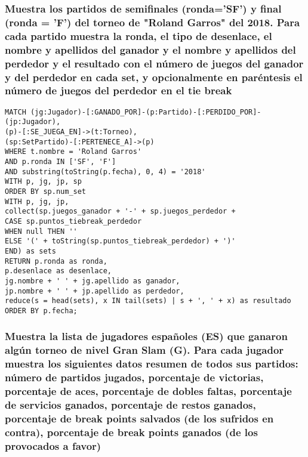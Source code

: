 \subsubsection{Muestra los partidos de semiﬁnales (ronda='SF') y ﬁnal (ronda = 'F') del torneo de "Roland Garros" del 2018. Para cada partido muestra la ronda, el tipo de desenlace, el nombre y apellidos del ganador y el nombre y apellidos del perdedor y el resultado con el número de juegos del ganador y del perdedor en cada set, y opcionalmente en paréntesis el número de juegos del perdedor en el tie break}

\begin{lstlisting}[language=Cypher]
MATCH (jg:Jugador)-[:GANADO_POR]-(p:Partido)-[:PERDIDO_POR]-(jp:Jugador),
(p)-[:SE_JUEGA_EN]->(t:Torneo),
(sp:SetPartido)-[:PERTENECE_A]->(p)
WHERE t.nombre = 'Roland Garros'
AND p.ronda IN ['SF', 'F']
AND substring(toString(p.fecha), 0, 4) = '2018'
WITH p, jg, jp, sp
ORDER BY sp.num_set
WITH p, jg, jp,
collect(sp.juegos_ganador + '-' + sp.juegos_perdedor +
CASE sp.puntos_tiebreak_perdedor
WHEN null THEN ''
ELSE '(' + toString(sp.puntos_tiebreak_perdedor) + ')'
END) as sets
RETURN p.ronda as ronda,
p.desenlace as desenlace,
jg.nombre + ' ' + jg.apellido as ganador,
jp.nombre + ' ' + jp.apellido as perdedor,
reduce(s = head(sets), x IN tail(sets) | s + ', ' + x) as resultado
ORDER BY p.fecha;
\end{lstlisting}





\subsubsection{Muestra la lista de jugadores españoles (ES) que ganaron algún torneo de nivel Gran Slam (G). Para cada jugador muestra los siguientes datos resumen de todos sus partidos: número de partidos jugados, porcentaje de victorias, porcentaje de aces, porcentaje de dobles faltas, porcentaje de servicios ganados, porcentaje de restos ganados, porcentaje de break points salvados (de los sufridos en contra), porcentaje de break points ganados (de los provocados a favor)}

